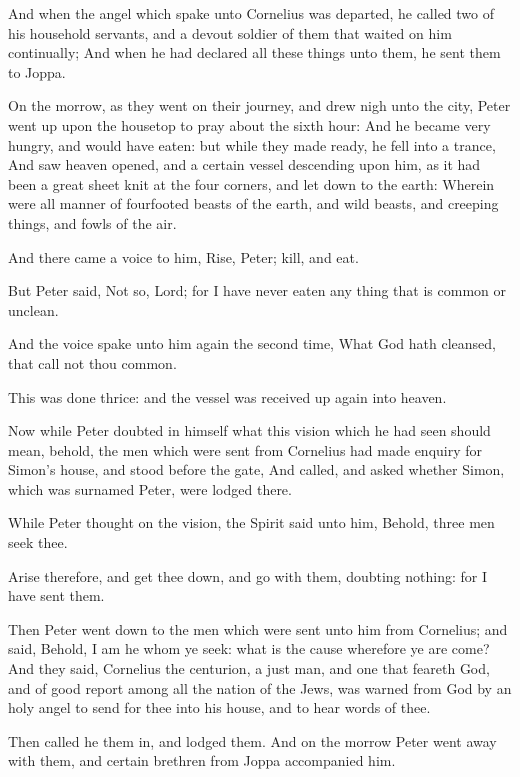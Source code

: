 \verse And when the angel which spake unto Cornelius was departed, he called two of his household servants, and a devout soldier of them that waited on him continually; \verse And when he had declared all these things unto them, he sent them to Joppa.

\verse On the morrow, as they went on their journey, and drew nigh unto the city, Peter went up upon the housetop to pray about the sixth hour: \verse And he became very hungry, and would have eaten: but while they made ready, he fell into a trance, \verse And saw heaven opened, and a certain vessel descending upon him, as it had been a great sheet knit at the four corners, and let down to the earth: \verse Wherein were all manner of fourfooted beasts of the earth, and wild beasts, and creeping things, and fowls of the air.

\verse And there came a voice to him, Rise, Peter; kill, and eat.

\verse But Peter said, Not so, Lord; for I have never eaten any thing that is common or unclean.

\verse And the voice spake unto him again the second time, What God hath cleansed, that call not thou common.

\verse This was done thrice: and the vessel was received up again into heaven.

\verse Now while Peter doubted in himself what this vision which he had seen should mean, behold, the men which were sent from Cornelius had made enquiry for Simon's house, and stood before the gate, \verse And called, and asked whether Simon, which was surnamed Peter, were lodged there.

\verse While Peter thought on the vision, the Spirit said unto him, Behold, three men seek thee.

\verse Arise therefore, and get thee down, and go with them, doubting nothing: for I have sent them.

\verse Then Peter went down to the men which were sent unto him from Cornelius; and said, Behold, I am he whom ye seek: what is the cause wherefore ye are come?  \verse And they said, Cornelius the centurion, a just man, and one that feareth God, and of good report among all the nation of the Jews, was warned from God by an holy angel to send for thee into his house, and to hear words of thee.

\verse Then called he them in, and lodged them. And on the morrow Peter went away with them, and certain brethren from Joppa accompanied him.


